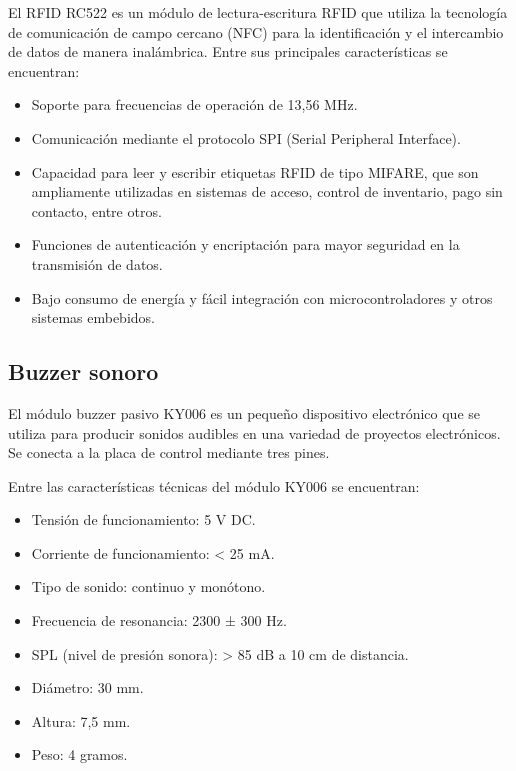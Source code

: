 El RFID RC522 \cite{MFRC522} es un módulo de lectura-escritura RFID que utiliza la tecnología de comunicación de campo cercano (NFC) para la identificación y el intercambio de datos de manera inalámbrica. Entre sus principales características se encuentran:

\begin{itemize}
\item Soporte para frecuencias de operación de 13,56 MHz.
\item Comunicación mediante el protocolo SPI (Serial Peripheral Interface).
\item Capacidad para leer y escribir etiquetas RFID de tipo MIFARE, que son ampliamente utilizadas en sistemas de acceso, control de inventario, pago sin contacto, entre otros.
\item Funciones de autenticación y encriptación para mayor seguridad en la transmisión de datos.
\item Bajo consumo de energía y fácil integración con microcontroladores y otros sistemas embebidos.
\end{itemize}

\subsection{Buzzer sonoro}
\label{subsec:buzzer}

El módulo buzzer pasivo KY006 \cite{BUZZER} es un pequeño dispositivo electrónico que se utiliza para producir sonidos audibles en una variedad de proyectos electrónicos. Se conecta a la placa de control mediante tres pines.

Entre las características técnicas del módulo KY006 se encuentran:

\begin{itemize}
\item Tensión de funcionamiento: 5 V DC.
\item Corriente de funcionamiento: < 25 mA.
\item Tipo de sonido: continuo y monótono.
\item Frecuencia de resonancia: 2300 ± 300 Hz.
\item SPL (nivel de presión sonora): > 85 dB a 10 cm de distancia.
\item Diámetro: 30 mm.
\item Altura: 7,5 mm.
\item Peso: 4 gramos.
\end{itemize}


